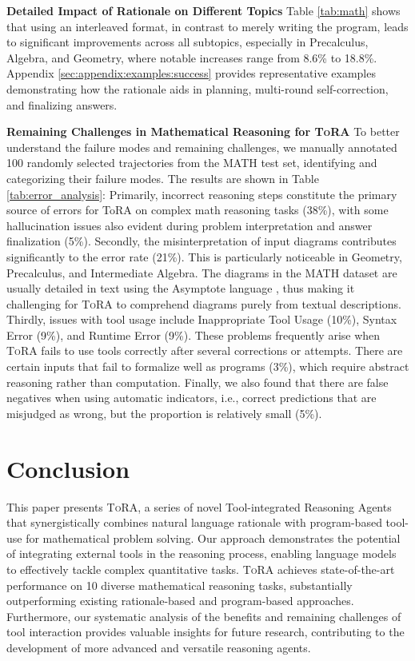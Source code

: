 \textbf{Detailed Impact of Rationale on Different Topics} Table \ref{tab:math} shows that using an interleaved format, in contrast to merely writing the program, leads to significant improvements across all subtopics, especially in Precalculus, Algebra, and Geometry, where notable increases range from 8.6\% to 18.8\%. Appendix \ref{sec:appendix:examples:success} provides representative examples demonstrating how the rationale aids in planning, multi-round self-correction, and finalizing answers.

\textbf{Remaining Challenges in Mathematical Reasoning for \textsc{ToRA}}
To better understand the failure modes and remaining challenges, we manually annotated 100 randomly selected trajectories from the MATH test set, identifying and categorizing their failure modes. The results are shown in Table \ref{tab:error_analysis}:
Primarily, incorrect reasoning steps constitute the primary source of errors for ToRA on complex math reasoning tasks (38\%), with some hallucination issues also evident during problem interpretation and answer finalization (5\%).
Secondly, the misinterpretation of input diagrams contributes significantly to the error rate (21\%). This is particularly noticeable in Geometry, Precalculus, and Intermediate Algebra. The diagrams in the MATH dataset are usually detailed in text using the Asymptote language \citep{hendrycksmath2021}, thus making it challenging for \textsc{ToRA} to comprehend diagrams purely from textual descriptions. Thirdly, issues with tool usage include Inappropriate Tool Usage (10\%), Syntax Error (9\%), and Runtime Error (9\%). 
These problems frequently arise when \textsc{ToRA} fails to use tools correctly after several corrections or attempts. There are certain inputs that fail to formalize well as programs (3\%), which require abstract reasoning rather than computation. Finally, we also found that there are false negatives when using automatic indicators, i.e., correct predictions that are misjudged as wrong, but the proportion is relatively small (5\%).

\section{Conclusion}

This paper presents \textsc{ToRA}, a series of novel Tool-integrated Reasoning Agents that synergistically combines natural language rationale with program-based tool-use for mathematical problem solving. Our approach demonstrates the potential of integrating external tools in the reasoning process, enabling language models to effectively tackle complex quantitative tasks. \textsc{ToRA} achieves state-of-the-art performance on 10 diverse mathematical reasoning tasks, substantially outperforming existing rationale-based and program-based approaches. Furthermore, our systematic analysis of the benefits and remaining challenges of tool interaction provides valuable insights for future research, contributing to the development of more advanced and versatile reasoning agents.

